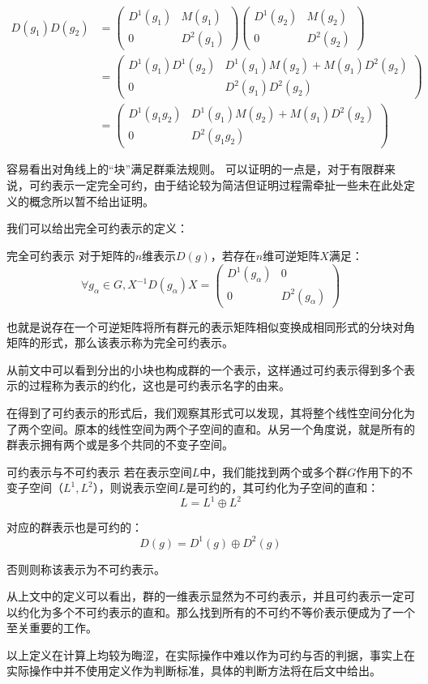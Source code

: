 \begin{align}
D(g_1)D(g_2)&=
\begin{pmatrix}
 D^1(g_1) & M(g_1)\\
 0 & D^2(g_1)
\end{pmatrix}
\begin{pmatrix}
 D^1(g_2) & M(g_2)\\
 0 & D^2(g_2)
\end{pmatrix} \\
&=\begin{pmatrix}
 D^1(g_1)D^1(g_2) & D^1(g_1)M(g_2)+M(g_1)D^2(g_2)\\
 0 & D^2(g_1)D^2(g_2)
\end{pmatrix} \\
&=\begin{pmatrix}
 D^1(g_1g_2) & D^1(g_1)M(g_2)+M(g_1)D^2(g_2)\\
 0 & D^2(g_1g_2)
\end{pmatrix}
\end{align}

容易看出对角线上的“块”满足群乘法规则。
可以证明的一点是，对于有限群来说，可约表示一定完全可约，由于结论较为简洁但证明过程需牵扯一些未在此处定义的概念所以暂不给出证明。

我们可以给出完全可约表示的定义：
\begin{definition}{完全可约表示}
对于矩阵的$n$维表示$D(g)$，若存在$n$维可逆矩阵$X$满足：
\begin{equation}
\forall g_\alpha\in G ,X^{-1}D(g_\alpha)X=
\begin{pmatrix}
 D^1(g_\alpha) & 0\\
 0 & D^2(g_\alpha)
\end{pmatrix}
\end{equation}

也就是说存在一个可逆矩阵将所有群元的表示矩阵相似变换成相同形式的分块对角矩阵的形式，那么该表示称为完全可约表示。
\end{definition}

从前文中可以看到分出的小块也构成群的一个表示，这样通过可约表示得到多个表示的过程称为表示的约化，这也是可约表示名字的由来。

在得到了可约表示的形式后，我们观察其形式可以发现，其将整个线性空间分化为了两个空间。原本的线性空间为两个子空间的直和。从另一个角度说，就是所有的群表示拥有两个或是多个共同的不变子空间。

\begin{definition}{可约表示与不可约表示}
若在表示空间$L$中，我们能找到两个或多个群$G$作用下的不变子空间（$L^1,L^2$），则说表示空间$L$是可约的，其可约化为子空间的直和：
$$L=L^1\oplus L^2$$

对应的群表示也是可约的：
$$D(g)=D^1(g)\oplus D^2(g)$$

否则则称该表示为不可约表示。
\end{definition}

从上文中的定义可以看出，群的一维表示显然为不可约表示，并且可约表示一定可以约化为多个不可约表示的直和。那么找到所有的不可约不等价表示便成为了一个至关重要的工作。

以上定义在计算上均较为晦涩，在实际操作中难以作为可约与否的判据，事实上在实际操作中并不使用定义作为判断标准，具体的判断方法将在后文中给出。